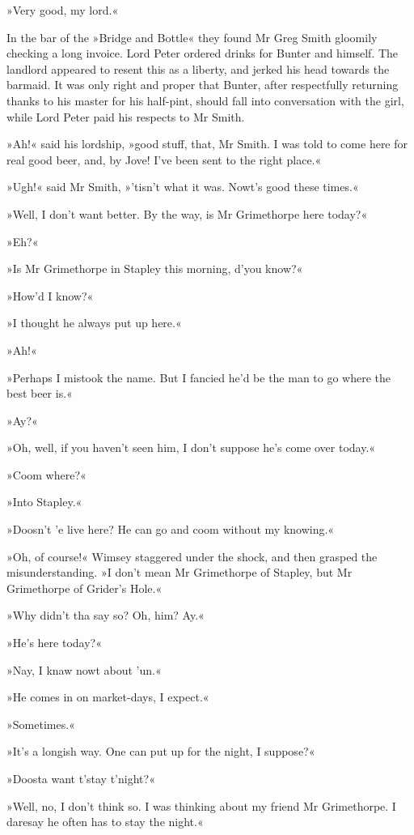 »Very good, my lord.«

In the bar of the »Bridge and Bottle« they found Mr Greg Smith gloomily checking a long invoice. Lord Peter ordered drinks for Bunter and himself. The landlord appeared to resent this as a liberty, and jerked his head towards the barmaid. It was only right and proper that Bunter, after respectfully returning thanks to his master for his half-pint, should fall into conversation with the girl, while Lord Peter paid his respects to Mr Smith.

»Ah!« said his lordship, »good stuff, that, Mr Smith. I was told to come here for real good beer, and, by Jove! I've been sent to the right place.«

»Ugh!« said Mr Smith, »'tisn't what it was. Nowt's good these times.«

»Well, I don't want better. By the way, is Mr Grimethorpe here today?«

»Eh?«

»Is Mr Grimethorpe in Stapley this morning, d'you know?«

»How'd I know?«

»I thought he always put up here.«

»Ah!«

»Perhaps I mistook the name. But I fancied he'd be the man to go where the best beer is.«

»Ay?«

»Oh, well, if you haven't seen him, I don't suppose he's come over today.«

»Coom where?«

»Into Stapley.«

»Doosn't 'e live here? He can go and coom without my knowing.«

»Oh, of course!« Wimsey staggered under the shock, and then grasped the misunderstanding. »I don't mean Mr Grimethorpe of Stapley, but Mr Grimethorpe of Grider's Hole.«

»Why didn't tha say so? Oh, him? Ay.«

»He's here today?«

»Nay, I knaw nowt about 'un.«

»He comes in on market-days, I expect.«

»Sometimes.«

»It's a longish way. One can put up for the night, I suppose?«

»Doosta want t'stay t'night?«

»Well, no, I don't think so. I was thinking about my friend Mr Grimethorpe. I daresay he often has to stay the night.«

